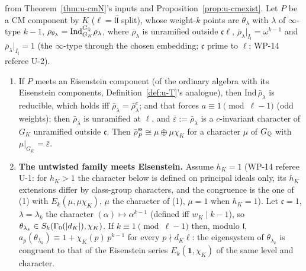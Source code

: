 \documentclass[11pt]{article}
\begin{document}
\begin{proposition}\label{prop:u-cmeis}
\PROVED{} from Theorem~\ref{thm:u-cmN}'s inputs and Proposition~\ref{prop:u-cmexist}. Let $P$ be a CM component by $K$ ($\ell=\mathfrak l\bar{\mathfrak l}$ split), whose weight-$k$
points are $\theta_\lambda$ with $\lambda$ of $\infty$-type $k-1$, $\rho_{\theta_\lambda}=\mathrm{Ind}_{G_K}^{G_{\mathbb{Q}}}\rho_\lambda$, where $\bar\rho_\lambda$ is unramified outside $\mathfrak c\ell$, $\bar\rho_\lambda|_{I_{\mathfrak l}}=\omega^{k-1}$ and
$\bar\rho_\lambda|_{I_{\bar{\mathfrak l}}}=1$ (the $\infty$-type through the chosen embedding; $\mathfrak c$ prime to $\ell$; WP-14 referee U-2).
\begin{enumerate}
\item If $P$ meets an Eisenstein component (of the ordinary algebra with its Eisenstein components, Definition~\ref{def:u-T}'s analogue), then
  $\mathrm{Ind}\,\bar\rho_\lambda$ is reducible, which holds iff $\bar\rho_\lambda=\bar\rho_\lambda^{c}$; and that forces \textbf{$a\equiv1\pmod{\ell-1}$} (odd weights); then $\bar\rho_\lambda$ is unramified at $\ell$, and $\bar\varepsilon:=\bar\rho_\lambda$ is a $c$-invariant
  character of $G_K$ unramified outside $\mathfrak c$. Then $\bar\rho_{P}^{\mathrm{ss}}\cong\mu\oplus\mu\chi_K$ for a character $\mu$ of $G_{\mathbb{Q}}$ with $\mu|_{G_K}=\bar\varepsilon$.
\item \textbf{The untwisted family meets Eisenstein.} Assume $h_K=1$ (WP-14 referee U-1: for $h_K>1$ the character below is defined on principal ideals only, its
  $h_K$ extensions differ by class-group characters, and the congruence is the one of (1) with $E_k(\mu,\mu\chi_K)$, $\mu$ the character of (1), $\mu=1$ when
  $h_K=1$). Let $\mathfrak c=1$, $\lambda=\lambda_k$ the character $(\alpha)\mapsto\alpha^{k-1}$ (defined iff $w_K\mid k-1$), so
  $\theta_{\lambda_k}\in S_k(\Gamma_0(\left| d_K \right|),\chi_K)$. If $k\equiv1\pmod{\ell-1}$ then, modulo $\mathfrak l$, $a_p(\theta_{\lambda_k})\equiv1+\chi_K(p)\,p^{k-1}$ for every
  $p\nmid d_K\ell$: the eigensystem of $\theta_{\lambda_k}$ is congruent to that of the Eisenstein series $E_k(\mathbf 1,\chi_K)$ of the same level and character.
\end{enumerate}
\end{proposition}
\end{document}
